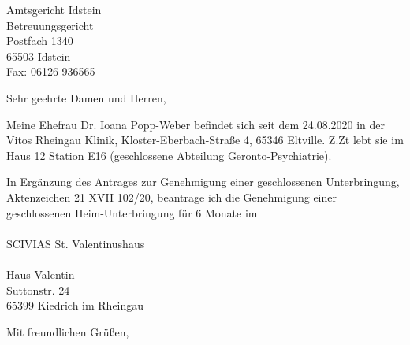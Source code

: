 \documentclass[%
  fontsize=12pt, %
  version=last%
]{scrlttr2}
\begin{document}
\begin{letter}{%
  Amtsgericht Idstein\\
  Betreuungsgericht\\
  Postfach 1340\\
  65503 Idstein\\
  Fax: 06126 936565%
}


 

\opening{Sehr geehrte Damen und Herren,}

Meine Ehefrau Dr. Ioana Popp-Weber befindet sich seit dem 24.08.2020 in der Vitos Rheingau Klinik, Kloster-Eberbach-Straße 4, 65346 Eltville. Z.Zt lebt sie im Haus 12 Station E16 (geschlossene Abteilung Geronto-Psychiatrie).

In Ergänzung des Antrages zur Genehmigung einer geschlossenen Unterbringung, Aktenzeichen 21 XVII 102/20, beantrage ich die Genehmigung einer geschlossenen Heim-Unterbringung für 6 Monate im
\\
\\
SCIVIAS St. Valentinushaus
\\
\\
Haus Valentin \\
Suttonstr. 24 \\
65399 Kiedrich im Rheingau



\closing{Mit freundlichen Grüßen,}




\end{letter}
\end{document}
